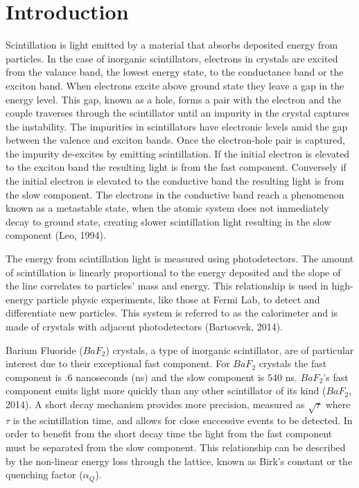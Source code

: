 \documentclass{article}
\begin{document}
\section{Introduction}

Scintillation is light emitted by a material that absorbs deposited energy from particles. In the case of inorganic scintillators, electrons in crystals are excited from the valance band, the lowest energy state, to the conductance band or the exciton band. When electrons excite above ground state they leave a gap in the energy level. This gap, known as a hole, forms a pair with the electron and the couple traverses through the scintillator until an impurity in the crystal captures the instability. The impurities in scintillators have electronic levels amid the gap between the valence and exciton bands. Once the electron-hole pair is captured, the impurity de-excites by emitting scintillation. If the initial electron is elevated to the exciton band the resulting light is from the fast component. Conversely if the initial electron is elevated to the conductive band the resulting light is from the slow component. The electrons in the conductive band reach a phenomenon known as a metastable state, when the atomic system does not immediately decay to ground state, creating slower scintillation light resulting in the slow component (Leo, 1994). 

The energy from scintillation light is measured using photodetectors. The amount of scintillation is linearly proportional to the energy deposited and the slope of the line correlates to particles' mass and energy. This relationship is used in high-energy particle physic experiments, like those at Fermi Lab, to detect and differentiate new particles. This system is referred to as the calorimeter and is made of crystals with adjacent photodetectors (Bartosvek, 2014). 

Barium Fluoride ($BaF_2$) crystals, a type of inorganic scintillator, are of particular interest due to their exceptional fast component. For $BaF_2$ crystals the fast component is .6 nanoseconds (ns) and the slow component is 540 ns. $BaF_2$'s fast component emits light more quickly than any other scintillator of its kind ($BaF_2$, 2014). A short decay mechanism provides more precision, measured as $\sqrt{\tau}$ where $\tau$ is the scintillation time, and allows for close successive events to be detected. In order to benefit from the short decay time the light from the fast component must be separated from the slow component. This relationship can be described by the non-linear energy loss through the lattice, known as Birk's constant or the quenching factor ($\alpha_Q$). 
\end{document}
